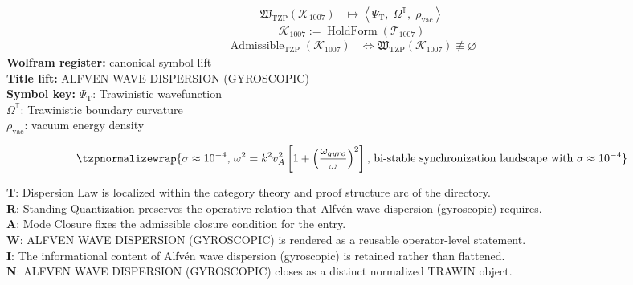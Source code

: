 \noindent
\begin{minipage}[t]{0.48\linewidth}
\begingroup
\small
\[
\begin{aligned}
\mathfrak{W}_{\mathrm{TZP}}\!\left(\mathcal{K}_{1007}\right)
&\longmapsto
\left\langle \Psi_{\mathrm{T}},\; \Omega^{\mathbb{T}},\; \rho_{\mathrm{vac}} \right\rangle
\end{aligned}
\]
\[
\mathcal{K}_{1007}
:=
\operatorname{HoldForm}\!\left(\mathcal{T}_{1007}\right)
\]
\[
\begin{aligned}
\operatorname{Admissible}_{\mathrm{TZP}}\!\left(\mathcal{K}_{1007}\right)
&\Longleftrightarrow
\mathfrak{W}_{\mathrm{TZP}}\!\left(\mathcal{K}_{1007}\right)\not\equiv\varnothing
\end{aligned}
\]
\textbf{Wolfram register:} canonical symbol lift\\
\textbf{Title lift:} ALFVEN WAVE DISPERSION (GYROSCOPIC)\\
\textbf{Symbol key:} \(\Psi_{\mathrm{T}}\): Trawinistic wavefunction\\ \(\Omega^{\mathbb{T}}\): Trawinistic boundary curvature\\ \(\rho_{\mathrm{vac}}\): vacuum energy density
\par
\endgroup
\end{minipage}\hfill
\begin{minipage}[t]{0.48\linewidth}
\[
\tzpnormalizewrap{\sigma \approx 10^{-4},\,\omega^2 = k^2 v_A^2 \left[ 1 + \left( \frac{\omega_{gyro}}{\omega} \right)^2 \right],\,\text{bi-stable synchronization landscape with } \sigma \approx 10^{-4}}
\]

\small
\textbf{T}: Dispersion Law is localized within the category theory and proof structure arc of the directory.\\
\textbf{R}: Standing Quantization preserves the operative relation that Alfv\'en wave dispersion (gyroscopic) requires.\\
\textbf{A}: Mode Closure fixes the admissible closure condition for the entry.\\
\textbf{W}: ALFVEN WAVE DISPERSION (GYROSCOPIC) is rendered as a reusable operator-level statement.\\
\textbf{I}: The informational content of Alfv\'en wave dispersion (gyroscopic) is retained rather than flattened.\\
\textbf{N}: ALFVEN WAVE DISPERSION (GYROSCOPIC) closes as a distinct normalized TRAWIN object.
\normalsize
\end{minipage}


